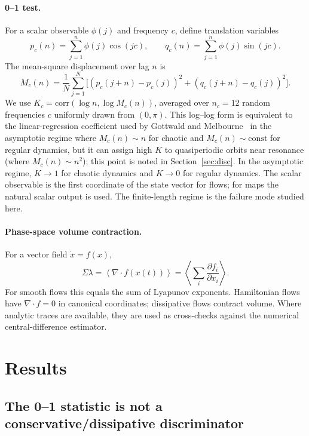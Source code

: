 \documentclass[11pt]{article}
\begin{document}
\paragraph{0--1 test.}
For a scalar observable $\phi(j)$ and frequency $c$, define translation variables
\begin{equation}
p_c(n)=\sum_{j=1}^{n}\phi(j)\cos(jc),\qquad
q_c(n)=\sum_{j=1}^{n}\phi(j)\sin(jc).
\end{equation}
The mean-square displacement over lag $n$ is
\begin{equation}
M_c(n)=\frac{1}{N}\sum_{j=1}^{N}\bigl[(p_c(j+n)-p_c(j))^2+(q_c(j+n)-q_c(j))^2\bigr].
\label{eq:Mc_def}
\end{equation}
We use $K_c=\mathrm{corr}(\log n,\log M_c(n))$, averaged over $n_c=12$ random
frequencies $c$ uniformly drawn from $(0,\pi)$.  This log--log form is equivalent
to the linear-regression coefficient used by Gottwald and Melbourne~\cite{gottwald2009}
in the asymptotic regime where $M_c(n)\sim n$ for chaotic and $M_c(n)\sim\mathrm{const}$
for regular dynamics, but it can assign high $K$ to quasiperiodic orbits near resonance
(where $M_c(n)\sim n^2$); this point is noted in Section~\ref{sec:disc}.
In the asymptotic regime, $K\to1$ for chaotic dynamics and $K\to0$ for regular
dynamics. The scalar observable is the first coordinate of the state vector for
flows; for maps the natural scalar output is used. The finite-length regime is the
failure mode studied here.

\paragraph{Phase-space volume contraction.}
For a vector field $\dot{x}=f(x)$,
\begin{equation}
\Sigma\lambda = \left\langle \nabla\!\cdot f(x(t))\right\rangle
=\left\langle\sum_i \frac{\partial f_i}{\partial x_i}\right\rangle.
\end{equation}
For smooth flows this equals the sum of Lyapunov exponents. Hamiltonian flows have
$\nabla\!\cdot f=0$ in canonical coordinates; dissipative flows contract volume.
Where analytic traces are available, they are used as cross-checks against the
numerical central-difference estimator.

\section{Results}

\subsection{The 0--1 statistic is not a conservative/dissipative discriminator}
\end{document}
